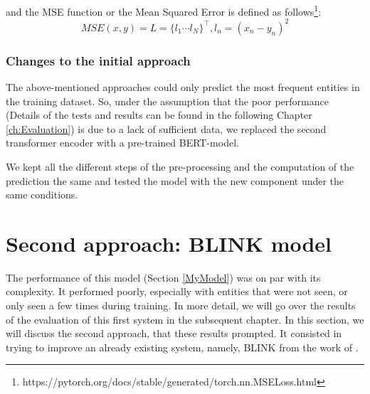 and the MSE function or the Mean Squared Error is defined as follows\footnote{https://pytorch.org/docs/stable/generated/torch.nn.MSELoss.html}: 
\begin{equation}
MSE(x, y) = L = {\{l_{1} \cdots l_{N}\}}^{\top}, l_{n}= (x_{n} - y_{n})^{2}
\end{equation}

\subsubsection{Changes to the initial approach}
The above-mentioned approaches could only predict the most frequent entities in the training dataset. So, under the assumption that the poor performance (Details of the tests and results can be found in the following Chapter \ref{ch:Evaluation}) is due to a lack of sufficient data, we replaced the second transformer encoder with a pre-trained BERT-model.\newline

We kept all the different steps of the pre-processing and the computation of the prediction the same and tested the model with the new component under the same conditions.\newline

\section{Second approach: BLINK model}
The performance of this model (Section \ref{MyModel}) was on par with its complexity. It performed poorly, especially with entities that were not seen, or only seen a few times during training. In more detail, we will go over the results of the evaluation of this first system in the subsequent chapter. In this section, we will discuss the second approach, that these results prompted. It consisted in trying to improve an already existing system, namely, BLINK from the work of \cite{Wu2020}.

